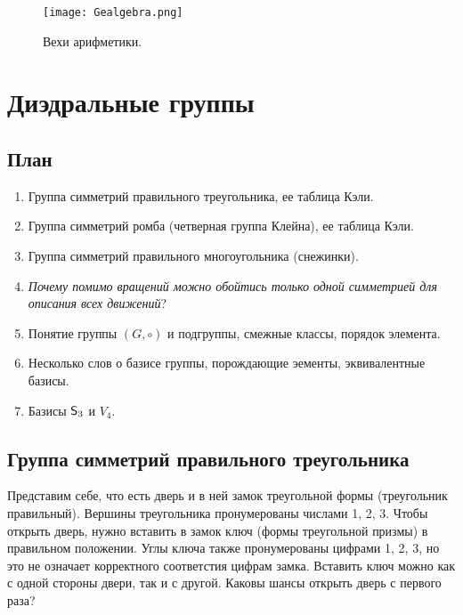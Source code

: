 
\begin{figure}[htb!]
\begin{center}
\texttt{[image: Gealgebra.png]}
\end{center}
\caption{Вехи арифметики.}\label{ariphmetics}
\end{figure}

\section{Диэдральные группы}


\subsection{План}
\begin{enumerate}
\item Группа симметрий правильного треугольника, ее таблица Кэли.
\item Группа симметрий ромба (четверная группа Клейна), ее таблица Кэли.
\item Группа симметрий правильного многоугольника (снежинки).
\item \textit{Почему помимо вращений можно обойтись только одной симметрией для описания всех движений}?
\item Понятие группы $(G,\circ)$ и подгруппы, смежные классы, порядок элемента.
\item Несколько слов о базисе группы, порождающие эементы, эквивалентные базисы.
\item Базисы ${\mathsf{S}}_3$ и $V_4$.
\end{enumerate}

\subsection{Группа симметрий правильного треугольника}

Представим себе, что есть дверь и в ней замок треугольной формы (треугольник правильный). Вершины треугольника пронумерованы числами 1, 2, 3. Чтобы открыть дверь, нужно вставить в замок ключ (формы треугольной призмы) в правильном положении.
Углы ключа также пронумерованы цифрами 1, 2, 3, но это не означает корректного соответстия цифрам замка.
Вставить ключ можно как с одной стороны двери, так и с другой. Каковы шансы открыть дверь с первого раза?

